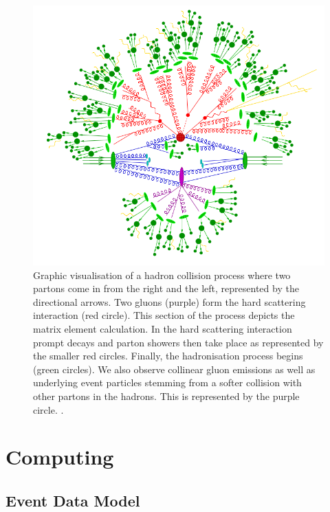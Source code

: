 \begin{figure} [p!] 
\begin{center}
\includegraphics[scale=0.55]{Figures/HadronCollisionProcess.png}
\end{center}
\caption{Graphic visualisation of a hadron collision process where two partons come in from the right and the left, represented by the directional arrows. Two gluons (purple) form the hard scattering interaction (red circle). This section of the process depicts the matrix element calculation. In the hard scattering interaction prompt decays and parton showers then take place as represented by the smaller red circles. Finally, the hadronisation process begins (green circles). We also observe collinear gluon emissions as well as underlying event particles stemming from a softer collision with other partons in the hadrons. This is represented by the purple circle. \cite{HadronCollisionProcess}.}
\label{fig-HadronCollisionProcess}
\end{figure}

\section{Computing}

\subsection{Event Data Model}

